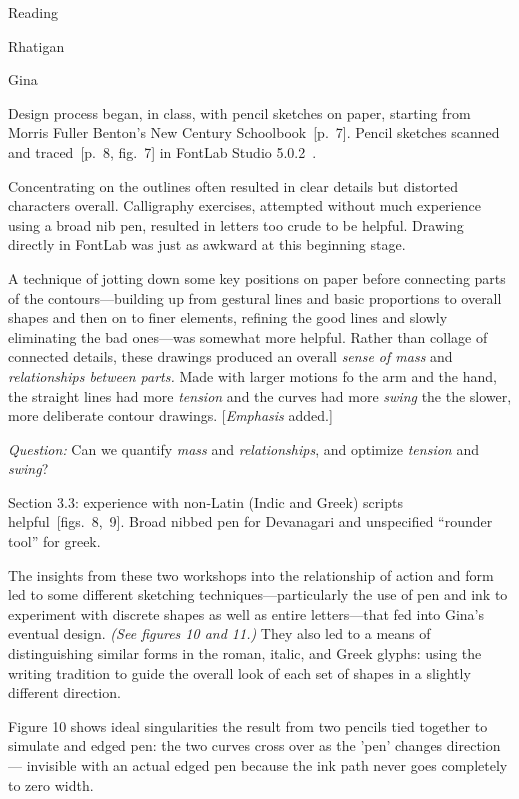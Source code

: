 \documentclass[11pt]{PalisadesLakesBook}
\begin{document}
\begin{plSection}{Reading}
\begin{plSection}{Rhatigan}
\begin{plSection}{Gina}
\begin{plSection}{}
Design process began, in class, with pencil sketches on paper,
starting from Morris Fuller Benton's New Century 
Schoolbook~[p.~7].
Pencil sketches scanned and traced~[p.~8, fig.~7] 
in FontLab Studio 5.0.2~\cite{FontLab:2021}.

\begin{plQuote}{}{}
Concentrating on the outlines often resulted in clear details
but distorted characters overall.
Calligraphy exercises, attempted without much experience 
using a broad nib pen, resulted in letters too crude
to be helpful. Drawing directly in FontLab was just as awkward
at this beginning stage.

A technique of jotting down some key positions on paper
before connecting parts of the contours---building up from gestural
lines and basic proportions to overall shapes 
and then on to finer elements, 
refining the good lines and slowly eliminating the bad ones---was
somewhat more helpful.
Rather than collage of connected details,
these drawings produced an overall \emph{sense of mass} 
and \emph{relationships between parts.}
Made with larger motions fo the arm and the hand,
the straight lines had more \emph{tension}
and the curves had more \emph{swing} 
the the slower, more deliberate contour drawings.
[\emph{Emphasis} added.]
\end{plQuote}

\emph{Question:}
Can we quantify \emph{mass} and \emph{relationships},
and optimize \emph{tension} and \emph{swing}?

Section 3.3: experience with non-Latin (Indic and Greek) 
scripts helpful~[figs.~8,~9]. Broad nibbed pen for Devanagari
and unspecified ``rounder tool'' for greek.

\begin{plQuote}{}{}
The insights from these two workshops into the relationship
of action and form led to some different sketching
techniques---particularly the use of pen and ink 
to experiment with discrete shapes as well as entire 
letters---that fed into Gina's eventual design.
\textit{(See figures 10 and 11.)}
They also led to a means of distinguishing similar forms
in the roman, italic, and Greek glyphs:
using the writing tradition to guide the overall look
of each set of shapes in a slightly different direction.
\end{plQuote}

Figure 10 shows ideal singularities the result from two pencils
tied together to simulate and edged pen: the two curves cross over
as the 'pen' changes direction --- invisible 
with an actual edged pen because the ink path never goes 
completely to zero width.


\end{plSection}
\end{plSection}
\end{plSection}
\end{plSection}
\end{document}
